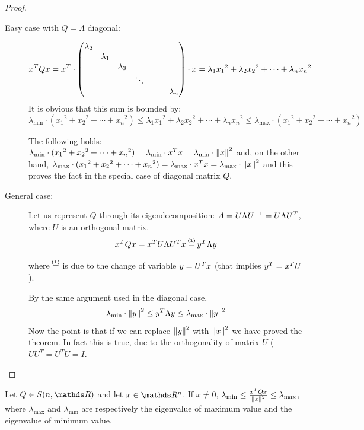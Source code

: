 \documentclass[computationalMathematics.tex]{subfiles}
\begin{document}
\begin{proof}
  \begin{description}
    \item[{\sc Easy case with $Q = \Lambda$ diagonal:}]
    
      $${x}^{T}Qx = {x}^{T} \cdot \begin{pmatrix}
    \lambda_2\\
    &\lambda_1\\
    &&\lambda_3\\
    &&& \ddots\\
    &&&&&&\lambda_n\\
    \end{pmatrix}
      \cdot x = \lambda_1 {x_1}^2 + \lambda_2 {x_2}^2 + \cdots + \lambda_n {x_n}^2$$
  It is obvious that this sum is bounded by:
  \[
    \lambda_{\text{min}} \cdot ({x_1}^2 +{x_2}^2 + \cdots + {x_n}^2) \le  \lambda_1 {x_1}^2 + \lambda_2 {x_2}^2 + \cdots + \lambda_n {x_n}^2 \le \lambda_{\text{max}} \cdot ({x_1}^2 +{x_2}^2 + \cdots + {x_n}^2)
  \]

      The following holds: $ \lambda_{\text{min}} \cdot ({x_1}^2 +{x_2}^2 + \cdots + {x_n}^2) =  \lambda_{\text{min}} \cdot {x}^{T} x =  \lambda_{\text{min}} \cdot {\left\lVert x\right\rVert}^2$ and, on the other hand, $ \lambda_{\text{max}} \cdot ({x_1}^2 +{x_2}^2 + \cdots + {x_n}^2) =  \lambda_{\text{max}} \cdot {x}^{T} x =  \lambda_{\text{max}} \cdot {\left\lVert x\right\rVert}^2$ and this proves the fact in the special case of diagonal matrix $Q$.
    \item[{\sc General case:}]
      Let us represent $Q$ through its eigendecomposition: $A = U \Lambda {U}^{-1} = U \Lambda {U}^{T}$, where $U$ is an orthogonal matrix.
      $$\tr{x}Qx = \tr{x} U \Lambda \tr{U} x \numeq{(1)} \tr{y} \Lambda y$$

      where $\numeq{(1)}$ is due to the change of variable $y = {U}^{T} x$ (that implies ${y}^{T} = {x}^{T} U$).

      By the same argument used in the diagonal case,
      $$\lambda_{\text{min}} \cdot {\left\lVert y\right\rVert}^2 \le {y}^{T} \Lambda y \le \lambda_{\text{max}} \cdot {\left\lVert y\right\rVert}^2$$
      Now the point is that if we can replace ${\left\lVert y\right\rVert}^2$ with ${\left\lVert x\right\rVert}^2$ we have proved the theorem.
      In fact this is true, due to the orthogonality of matrix $U$ ( $UU^T = U^TU = I$.
  \end{description}
\end{proof}

\begin{corollary}
  Let $Q \in S(n, \R)$ and let $x \in \R^n$. If $x \neq 0$, $\lambda_{\text{min}} \le \frac{{x}^{T}Qx}{{\left\lVert x\right\rVert}^2} \le \lambda_{\text{max}}$, where $\lambda_{\text{max}}$ and $\lambda_{\text{min}}$ are respectively the eigenvalue of maximum value and the eigenvalue of minimum value.
\end{corollary}
\end{document}
